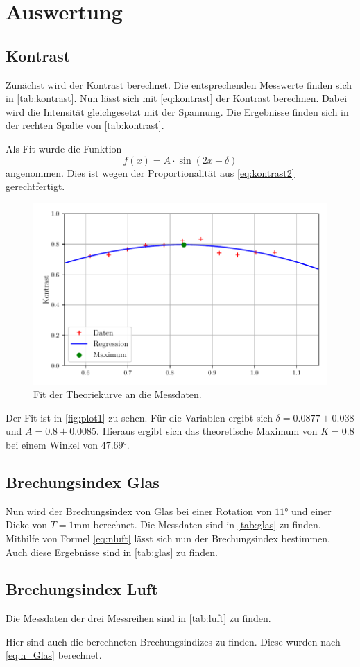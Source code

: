\section{Auswertung}
\label{sec:Auswertung}

\subsection{Kontrast}
Zunächst wird der Kontrast berechnet.
Die entsprechenden Messwerte finden sich in \autoref{tab:kontrast}.
Nun lässt sich mit \autoref{eq:kontrast} der Kontrast berechnen. Dabei wird die Intensität gleichgesetzt mit der Spannung.
Die Ergebnisse finden sich in der rechten Spalte von \autoref{tab:kontrast}.

Als Fit wurde die Funktion 
\begin{equation*}
    f(x) = A \cdot \sin(2 x - \delta)
\end{equation*}
angenommen. Dies ist wegen der Proportionalität aus \autoref{eq:kontrast2} gerechtfertigt.
\begin{figure}
    \centering
    \includegraphics[width = 0.7 \linewidth]{build/Kontrast.pdf}
    \caption{Fit der Theoriekurve an die Messdaten.}
    \label{fig:plot1}
\end{figure}
Der Fit ist in \autoref{fig:plot1} zu sehen.
Für die Variablen ergibt sich $\delta = 0.0877 \pm 0.038$ und $A = 0.8 \pm 0.0085$.
Hieraus ergibt sich das theoretische Maximum von $K = 0.8$ bei einem Winkel von $47.69°$.

\subsection{Brechungsindex Glas}
Nun wird der Brechungsindex von Glas bei einer Rotation von $11°$ und einer Dicke von $T = 1 \unit{\milli\meter}$ berechnet.
Die Messdaten sind in \autoref{tab:glas} zu finden.
Mithilfe von Formel \autoref{eq:nluft} lässt sich nun der Brechungsindex bestimmen.
Auch diese Ergebnisse sind in \autoref{tab:glas} zu finden.


\subsection{Brechungsindex Luft}
Die Messdaten der drei Messreihen sind in \autoref{tab:luft} zu finden.

Hier sind auch die berechneten Brechungsindizes zu finden.
Diese wurden nach \autoref{eq:n_Glas} berechnet.